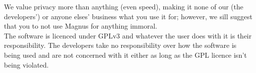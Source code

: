 \documentclass{article}
\begin{document}
We value privacy more than anything (even speed), making it none of our (the developers')
or anyone elses' business what you use it for; however, we sill suggest that
you to not use Magnus for anything immoral. \\

The software is licenced under GPLv3 and whatever the user does with it
is their responsibility. The developers take no responsibility over how
the software is being used and are not concerned with it either as long
as the GPL licence isn't being violated.
\end{document}
